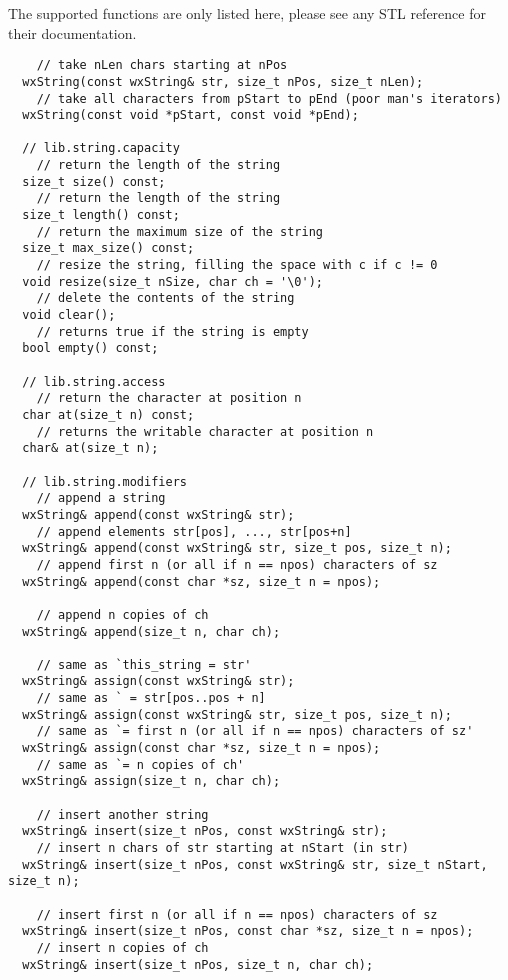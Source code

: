 \label{wxstringat}

The supported functions are only listed here, please see any STL reference for
their documentation.

\begin{verbatim}
    // take nLen chars starting at nPos
  wxString(const wxString& str, size_t nPos, size_t nLen);
    // take all characters from pStart to pEnd (poor man's iterators)
  wxString(const void *pStart, const void *pEnd);

  // lib.string.capacity
    // return the length of the string
  size_t size() const;
    // return the length of the string
  size_t length() const;
    // return the maximum size of the string
  size_t max_size() const;
    // resize the string, filling the space with c if c != 0
  void resize(size_t nSize, char ch = '\0');
    // delete the contents of the string
  void clear();
    // returns true if the string is empty
  bool empty() const;

  // lib.string.access
    // return the character at position n
  char at(size_t n) const;
    // returns the writable character at position n
  char& at(size_t n);

  // lib.string.modifiers
    // append a string
  wxString& append(const wxString& str);
    // append elements str[pos], ..., str[pos+n]
  wxString& append(const wxString& str, size_t pos, size_t n);
    // append first n (or all if n == npos) characters of sz
  wxString& append(const char *sz, size_t n = npos);

    // append n copies of ch
  wxString& append(size_t n, char ch);

    // same as `this_string = str'
  wxString& assign(const wxString& str);
    // same as ` = str[pos..pos + n]
  wxString& assign(const wxString& str, size_t pos, size_t n);
    // same as `= first n (or all if n == npos) characters of sz'
  wxString& assign(const char *sz, size_t n = npos);
    // same as `= n copies of ch'
  wxString& assign(size_t n, char ch);

    // insert another string
  wxString& insert(size_t nPos, const wxString& str);
    // insert n chars of str starting at nStart (in str)
  wxString& insert(size_t nPos, const wxString& str, size_t nStart, size_t n);

    // insert first n (or all if n == npos) characters of sz
  wxString& insert(size_t nPos, const char *sz, size_t n = npos);
    // insert n copies of ch
  wxString& insert(size_t nPos, size_t n, char ch);


\end{verbatim}
